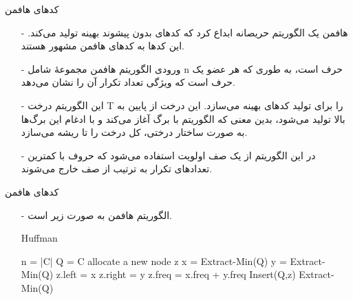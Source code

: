 \begin{frame}{‌کدهای هافمن}
\begin{itemize}\itemr
\item[-]
هافمن یک الگوریتم حریصانه ابداع کرد که کدهای بدون پیشوند بهینه تولید می‌کند. این کدها به کدهای هافمن مشهور هستند.
\item[-]
ورودی الگوریتم هافمن مجموعهٔ
شامل n حرف است، به طوری که هر عضو
یک حرف است که ویژگی
تعداد تکرار آن را نشان می‌دهد.
\item[-]
این الگوریتم درخت T را برای تولید کدهای بهینه می‌سازد. این درخت از پایین به بالا تولید می‌شود، بدین معنی که الگوریتم با
برگ آغاز می‌کند و با ادغام این برگ‌ها به صورت ساختار درختی، کل درخت را تا ریشه می‌سازد.
\item[-]
در این الگوریتم از یک صف اولویت استفاده می‌شود که حروف با کمترین تعداد‌های تکرار به ترتیب از صف خارج می‌شوند.
\end{itemize}
\end{frame}


\begin{frame}{‌کدهای هافمن}
\begin{itemize}\itemr
\item[-]
الگوریتم هافمن به صورت زیر است.
\begin{algorithm}[H]\alglr
  \caption{Huffman} 
  \begin{algorithmic}[1]
   \State n = |C|
   \State Q = C
   			\State allocate a new node z
   			\State x = Extract-Min(Q)
   			\State y = Extract-Min(Q)
   			\State z.left = x
   			\State z.right = y
   			\State z.freq = x.freq + y.freq
   			\State Insert(Q,z)
   	\EndFor
   	\State \Return Extract-Min(Q)                        
  \end{algorithmic}
  \label{alg:merge}
\end{algorithm}
\end{itemize}
\end{frame}


